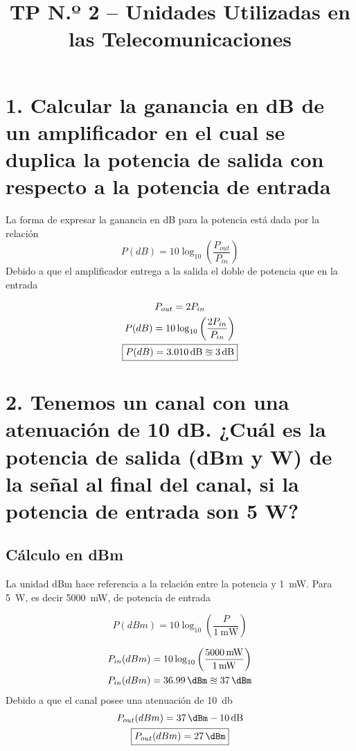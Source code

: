 \documentclass[11pt,a4paper]{article}
\title{\textbf{TP N.º 2 -- Unidades Utilizadas en las Telecomunicaciones}}
\author{}
\date{}
\begin{document}


\maketitle

\section*{1. Calcular la ganancia en dB de un amplificador en el cual se duplica la potencia
de salida con respecto a la potencia de entrada}
La forma de expresar la ganancia en dB para la potencia está dada por la relación
\begin{equation}
    P(dB) = 10\log_{10} \left( \frac{P_{out}}{P_{in}}\right)
\end{equation}
Debido a que el amplificador entrega a la salida el doble de potencia que en la entrada

\[
   \begin{gathered} 
       P_{out} = 2 P_{in} \\
       P(dB) = 10\log_{10} \left( \frac{2P_{in}}{P_{in}}\right) \\
       \boxed{P(dB) = \SI{3{,}010}{\decibel}\approxeq \SI{3}{\decibel}}
   \end{gathered} 
\]

\section*{2. Tenemos un canal con una atenuación de 10 dB. ¿Cuál es la potencia de salida
(dBm y W) de la señal al final del canal, si la potencia de entrada son 5 W? }


\subsection*{Cálculo en dBm}
La unidad dBm hace referencia a la relación entre la potencia y
\SI{1}{\milli\watt}. Para \SI{5}{\watt}, es decir \SI{5000}{\milli\watt}, de potencia de
entrada

\begin{equation}
    P(dBm) = 10\log_{10} \left( \frac{P}{\SI{1}{\milli\watt}}\right)
    \label{eq:dbm}
\end{equation}

\[
   \begin{gathered} 
       P_{in}(dBm) = 10\log_{10} \left(
       \frac{\SI{5000}{\milli\watt}}{\SI{1}{\milli\watt}}\right) \\
       P_{in}(dBm) = \SI{36{,}99}{\dBm} \approxeq \SI{37}{\dBm}
   \end{gathered} 
\]
Debido a que el canal posee una atenuación de \SI{10}{\decibel}
\[
   \begin{gathered} 
       P_{out}(dBm) = \SI{37}{\dBm} - \SI{10}{\decibel} \\
       \boxed{P_{out}(dBm) = \SI{27}{\dBm}}
   \end{gathered} 
\]
\end{document}
